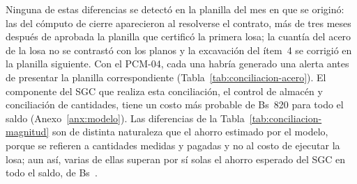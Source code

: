 Ninguna de estas diferencias se detectó en la planilla del mes en que se originó: las del cómputo de cierre aparecieron al resolverse el contrato, más de tres meses después de aprobada la planilla que certificó la primera losa; la cuantía del acero de la losa no se contrastó con los planos y la excavación del ítem~4 se corrigió en la planilla siguiente. Con el PCM-04, cada una habría generado una alerta antes de presentar la planilla correspondiente (Tabla~\ref{tab:conciliacion-acero}). El componente del SGC que realiza esta conciliación, el control de almacén y conciliación de cantidades, tiene un costo más probable de Bs~820 para todo el saldo (Anexo~\ref{anx:modelo}). Las diferencias de la Tabla~\ref{tab:conciliacion-magnitud} son de distinta naturaleza que el ahorro estimado por el modelo, porque se refieren a cantidades medidas y pagadas y no al costo de ejecutar la losa; aun así, varias de ellas superan por sí solas el ahorro esperado del SGC en todo el saldo, de Bs~\AhorroMedia{}.

